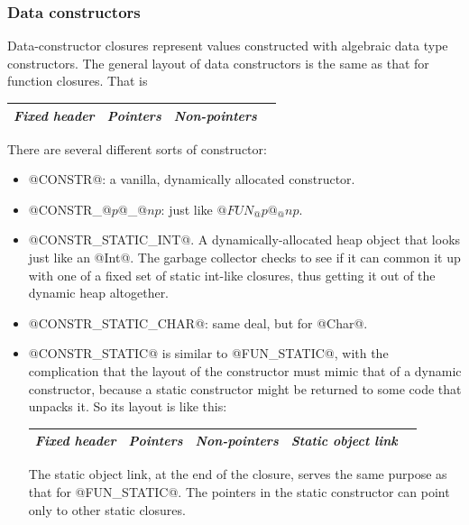 \documentclass[11pt]{article}
\newcommand{\Subsubsection}[2]{\subsubsection{#1}\label{sec:#2}}
\begin{document}
\Subsubsection{Data constructors}{CONSTR}

Data-constructor closures represent values constructed with algebraic
data type constructors.  The general layout of data constructors is
the same as that for function closures.  That is

\begin{center}
\begin{tabular}{|l|l|l|l|}\hline
\emph{Fixed header}  & \emph{Pointers} & \emph{Non-pointers} \\ \hline
\end{tabular}
\end{center}

There are several different sorts of constructor:

\begin{itemize}

\item @CONSTR@: a vanilla, dynamically allocated constructor.

\item @CONSTR_@$p$@_@$np$: just like $@FUN_@p@_@np$.

\item @CONSTR_STATIC_INT@.  A dynamically-allocated heap object that
looks just like an @Int@.  The garbage collector checks to see if it
can common it up with one of a fixed set of static int-like closures,
thus getting it out of the dynamic heap altogether.

\item @CONSTR_STATIC_CHAR@:  same deal, but for @Char@.

\item @CONSTR_STATIC@ is similar to @FUN_STATIC@, with the
complication that the layout of the constructor must mimic that of a
dynamic constructor, because a static constructor might be returned to
some code that unpacks it.  So its layout is like this:

\begin{center}
\begin{tabular}{|l|l|l|l|l|}\hline
\emph{Fixed header}  & \emph{Pointers} & \emph{Non-pointers} & \emph{Static object link}\\ \hline
\end{tabular}
\end{center}

The static object link, at the end of the closure, serves the same purpose
as that for @FUN_STATIC@.  The pointers in the static constructor can point
only to other static closures.


\end{itemize}
\end{document}
